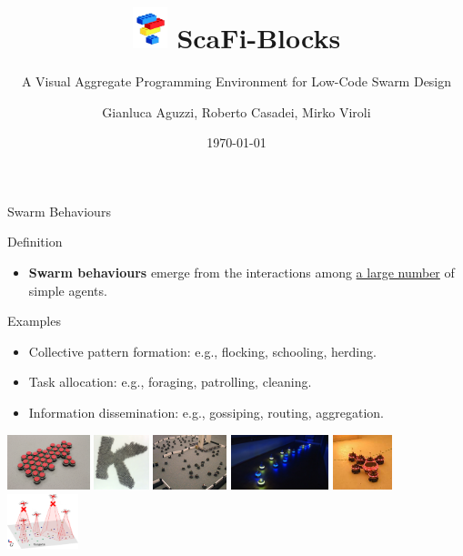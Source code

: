 \documentclass[aspectratio=169]{beamer}
\title{\includegraphics[width=1cm]{img/scafiblocks-logo.png} ScaFi-Blocks}
\subtitle{A Visual Aggregate Programming Environment for Low-Code Swarm Design}
\date{\today}
\author{\alert{Gianluca Aguzzi}, Roberto Casadei, Mirko Viroli}
\institute{University of Bologna, Cesena \\ Talk @ \alert{COORDINATION 2024}}
\begin{document}
  \maketitle

  \begin{frame}[fragile]{Swarm Behaviours}

	\begin{alertblock}{Definition}
		\begin{itemize}
			\item 
			\textbf{Swarm behaviours} emerge from the interactions among \underline{a large number} of simple agents.
		
		\end{itemize}
	\end{alertblock}
	\begin{exampleblock}{Examples}
		\begin{itemize}
			\item Collective pattern formation: e.g., flocking, schooling, herding.
			\item Task allocation: e.g., foraging, patrolling, cleaning.
			\item Information dissemination: e.g., gossiping, routing, aggregation.
		\end{itemize}

	\end{exampleblock}
	\begin{center}
	\includegraphics[height=1.6cm]{img/aggregation.jpg}
	\includegraphics[height=1.6cm]{img/pattern-formation.png}
	\includegraphics[height=1.6cm]{img/exploration.jpg}
	\includegraphics[height=1.6cm]{img/navigation.jpg}
	\includegraphics[height=1.6cm]{img/transportation.jpeg}
	\includegraphics[height=1.6cm]{img/localization.png}
	\end{center}
	\end{frame}
\end{document}
